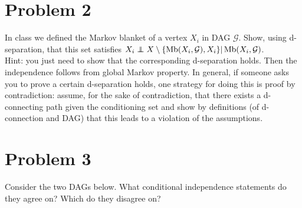 \documentclass[letterpaper]{article}
\def\independenT#1#2{\mathrel{\rlap{$#1#2$}\mkern2mu{#1#2}}}
\newcommand\indep{\protect\mathpalette{\protect\independenT}{\perp}}
\def\independenT#1#2{\mathrel{\rlap{$#1#2$}\mkern2mu{#1#2}}}
\DeclareMathOperator*{\Mb}{\text{Mb}}
\begin{document}
\section*{Problem 2}

In class we defined the Markov blanket of a vertex $X_i$ in DAG $\mathcal{G}$. Show, using d-separation, that this set satisfies $X_i \indep {X} \setminus \{\Mb(X_i,\mathcal{G}), X_i\} | \Mb(X_i, \mathcal{G})$. \\ [2ex]
\small
Hint: you just need to show that the corresponding d-separation holds. Then the independence follows from global Markov property. In general, if someone asks you to prove a certain d-separation holds, one strategy for doing this is proof by contradiction: assume, for the sake of contradiction, that there exists a d-connecting path given the conditioning set and show by definitions (of d-connection and DAG) that this leads to a violation of the assumptions.
\normalsize
\section*{Problem 3}
Consider the two DAGs below. What conditional independence statements do they agree on? Which do they disagree on?
\begin{figure}[h]
	\begin{center}
	\end{center}
\caption{}
\end{figure}
\end{document}
